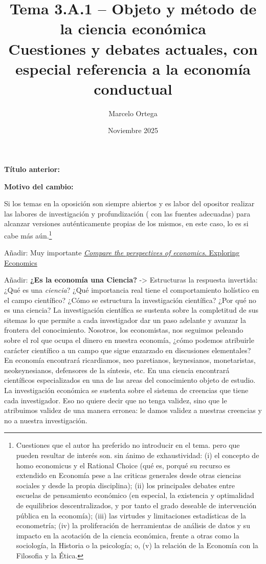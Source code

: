 \documentclass[10pt,a4paper]{article}
\title{Tema 3.A.1 -- Objeto y método de la ciencia económica\\
\large Cuestiones y debates actuales, con especial referencia a la economía conductual}
\author{Marcelo Ortega}
\date{Noviembre 2025}
\newcommand{\puntosclave}[1]{%
  \begin{tcolorbox}[
    colframe=black,
    title={Puntos clave},
    before upper={\setlength{\parindent}{0.5cm}\setlength{\parskip}{0.5\baselineskip}}
  ]
  #1
  \end{tcolorbox}
}
\newcommand{\modificaciones}[1]{
  \begin{tcolorbox}[
    colback=white,
    colframe=red,
    title={Modificaciones a realizar},
    before upper={\setlength{\parindent}{0.5cm}\setlength{\parskip}{0.5\baselineskip}}
  ]
  #1
  \end{tcolorbox}
}
\newcommand{\changebox}{%
\begin{tcolorbox}[title={Historial de cambios del tema}]
\textbf{Título anterior:} \OldTitle\par
\textbf{Motivo del cambio:} \ChangeWhy
\end{tcolorbox}
}
\begin{document}
\maketitle
\changebox

\newpage

\puntosclave{ %
    Si los temas en la oposición son siempre abiertos y es labor del opositor realizar las labores de investigación y profundización ( con las fuentes adecuadas) para alcanzar versiones auténticamente propias de los mismos, en este caso, lo es si cabe más aún.\footnote{%
        Cuestiones que el autor ha preferido no introducir en el tema. pero que pueden resultar de interés son. sin ánimo de exhaustividad: (i) el concepto de homo economicus y el Rational Choice (qué es, porqué su recurso es extendido en Economía pese a las criticas generales desde otras ciencias sociales y desde la propia disciplina); (ii) los principales debates entre escuelas de pensamiento económico (en especial, la existencia y optimalidad de equilibrios descentralizados, y por tanto el grado deseable de intervención pública en la economía); (iii) las virtudes y limitaciones estadísticas de la econometría; (iv) la proliferación de herramientas de análisis de datos y su impacto en la acotación de la ciencia económica, frente a otras como la sociología, la Historia o la psicología; o, (v) la relación de la Economía con la Filosofia y la Ética.
    }
    }
\vspace{1cm}

\modificaciones{
    Añadir: Muy importante \href{https://www.exploring-economics.org/en/orientation/#discover}{\textit{Compare the perspectives of economics}. Exploring Economics}

    Añadir: \textbf{¿Es la economía una Ciencia?} -> Estructuras la respuesta invertida: ¿Qué es una \textit{ciencia}? ¿Qué importancia real tiene el comportamiento holístico en el campo científico? ¿Cómo se estructura la investigación científica? ¿Por qué no es una ciencia? La investigación científica se sustenta sobre la completitud de sus sitemas lo que permite a cada investigador dar un paso adelante y avanzar la frontera del conocimiento. Nosotros, los economistas, nos seguimos peleando sobre el rol que ocupa el dinero en nuestra economía, ¿cómo podemos atribuirle carácter científico a un campo que sigue enzarzado en discusiones elementales? En economía encontrará ricardiamos, neo paretianos, keynesianos, monetaristas, neokeynesianos, defensores de la síntesis, etc. En una ciencia encontrará científicos especializados en una de las areas del conocimiento objeto de estudio. La investigación económica se sustenta sobre el sistema de creencias que tiene cada investigador. Eso no quiere decir que no tenga validez, sino que le atribuimos validez de una manera erronea: le damos validez a nuestras creencias y no a nuestra investigación.

}
\end{document}
